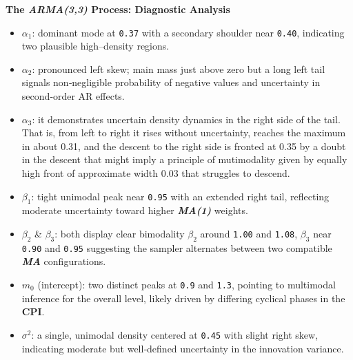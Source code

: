\documentclass{Configuration_Files/PoliMi3i_thesis}
\begin{document}
\textbf{The \textbf{\textit{ARMA(3,3)}} Process: Diagnostic Analysis}
\begin{itemize}
  \item \(\alpha_1\): dominant mode at \texttt{0.37} with a secondary shoulder near \texttt{0.40}, indicating two plausible high–density regions.
  \item \(\alpha_2\): pronounced left skew; main mass just above zero but a long left tail signals non‐negligible probability of negative values and uncertainty in second‐order AR effects.
  \item \(\alpha_3\): it demonstrates uncertain density dynamics in the right side of the tail. That is, from left to right it rises without uncertainty, reaches the maximum in about 0.31, and the descent to the right side is fronted at 0.35 by a doubt in the descent that might imply a principle of mutimodality given by equally high front of approximate width 0.03 that struggles to descend.
  \item \(\beta_1\): tight unimodal peak near \texttt{0.95} with an extended right tail, reflecting moderate uncertainty toward higher \textbf{\textit{MA(1)}} weights.
  \item \(\beta_2\) \& \(\beta_3\): both display clear bimodality \(\beta_2\) around \texttt{1.00} and \texttt{1.08}, \(\beta_3\) near \texttt{0.90} and \texttt{0.95} suggesting the sampler alternates between two compatible \textbf{\textit{MA}} configurations.
  \item \(m_0\) (intercept): two distinct peaks at \texttt{0.9} and \texttt{1.3}, pointing to multimodal inference for the overall level, likely driven by differing cyclical phases in the \textbf{CPI}.
  \item \(\sigma^2\): a single, unimodal density centered at \texttt{0.45} with slight right skew, indicating moderate but well‐defined uncertainty in the innovation variance.
\end{itemize}


\end{document}
